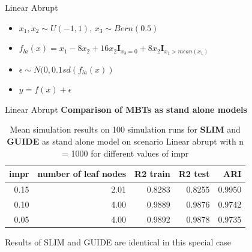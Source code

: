 \documentclass[9pt, xcolor=table]{beamer}
\begin{document}
\begin{frame}{Linear Abrupt}
\begin{itemize}
    \item $x_1, x_2 \sim U(-1,1)$, $x_3 \sim Bern(0.5)$
    \item $ f_{la}(x) = x_{1} - 8  x_2 + 16  x_2  \mathbf{I}_{x_3 = 0} + 8  x_2  \mathbf{I}_{x_1 > mean(x_1)}$
    \item $\epsilon \sim N(0, 0.1 sd(f_{la}(x))$
    \item $y = f(x) + \epsilon$
\end{itemize}    
\end{frame}


\begin{frame}{Linear Abrupt}
\textbf{Comparison of MBTs as stand alone models}

\begin{table}
\caption{Mean simulation results on 100 simulation runs for \textbf{SLIM} and \textbf{GUIDE}  as stand alone model on scenario Linear abrupt with n = 1000 for different values of impr }
\centering
\begin{tabular}[t]{r|r|r|r|r}
\hline
impr & number of leaf nodes & R2 train & R2 test & ARI\\
\hline
0.15 & 2.01 & 0.8283 & 0.8255 & 0.9950\\
\hline
0.10 & 4.00 & 0.9889 & 0.9876 & 0.9742\\
\hline
0.05 & 4.00 & 0.9892 & 0.9878 & 0.9735\\
\hline
\end{tabular}
\end{table}    

Results of SLIM and GUIDE are identical in this special case
\end{frame}
\end{document}
